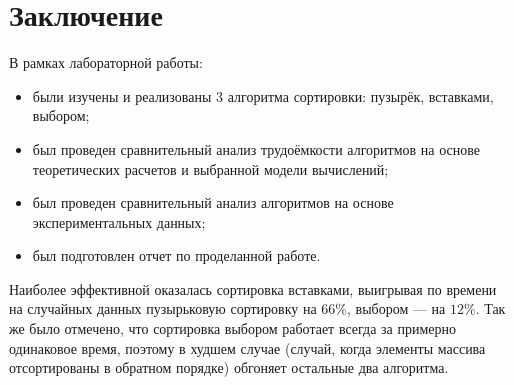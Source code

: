 \chapter*{Заключение}

В рамках лабораторной работы:
\begin{itemize}
	\item были изучены и реализованы 3 алгоритма сортировки: пузырёк, вставками, выбором;
	\item был проведен сравнительный анализ трудоёмкости алгоритмов на основе теоретических расчетов и выбранной модели вычислений;
	\item был проведен сравнительный анализ алгоритмов на основе экспериментальных данных;
    \item был подготовлен отчет по проделанной работе.
\end{itemize}

Наиболее эффективной оказалась сортировка вставками, выигрывая по времени на случайных данных пузырьковую сортировку на $66\%$, выбором — на $12\%$.
Так же было отмечено, что сортировка выбором работает всегда за примерно одинаковое время, поэтому в худшем случае (случай, когда элементы массива отсортированы в обратном порядке) обгоняет остальные два алгоритма.
